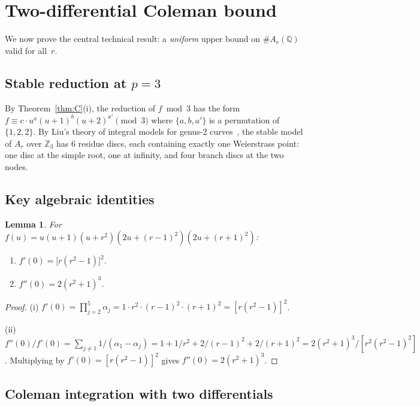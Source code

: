 \documentclass[11pt]{amsart}
\theoremstyle{plain}
\newtheorem{lemma}[theorem]{Lemma}
\theoremstyle{definition}
\theoremstyle{remark}
\newcommand{\ZZ}{\mathbb{Z}}
\newcommand{\QQ}{\mathbb{Q}}
\begin{document}
\section{Two-differential Coleman bound}\label{sec:coleman}

We now prove the central technical result: a \emph{uniform} upper bound on
$\#A_r(\QQ)$ valid for all~$r$.

\subsection{Stable reduction at $p=3$}

By Theorem~\ref{thm:C}(i), the reduction of $f\bmod 3$ has the form
$f\equiv c\cdot u^a(u{+}1)^b(u{+}2)^{a'}\pmod{3}$
where $\{a,b,a'\}$ is a permutation of $\{1,2,2\}$.
By Liu's theory of integral models for genus-2 curves~\cite{LiuGenusTwo},
the stable model of $A_r$ over $\ZZ_3$ has 6 residue discs, each containing
exactly one Weierstrass point: one disc at the simple root, one at infinity,
and four branch discs at the two nodes.

\subsection{Key algebraic identities}

\begin{lemma}\label{lem:derivatives}
For $f(u)=u(u{+}1)(u{+}r^2)(2u{+}(r{-}1)^2)(2u{+}(r{+}1)^2)$:
\begin{enumerate}[label=\textup{(\roman*)}]
\item $f'(0) = \bigl[r(r^2-1)\bigr]^2$.
\item $f''(0) = 2(r^2+1)^3$.
\end{enumerate}
\end{lemma}

\begin{proof}
(i) $f'(0)=\prod_{j=2}^{5}\alpha_j = 1\cdot r^2\cdot(r{-}1)^2\cdot(r{+}1)^2
= [r(r^2-1)]^2$.

(ii) $f''(0)/f'(0)=\sum_{j\ne 1}1/(\alpha_1-\alpha_j)
= 1+1/r^2+2/(r{-}1)^2+2/(r{+}1)^2 = 2(r^2+1)^3/[r^2(r^2-1)^2]$.
Multiplying by $f'(0)=[r(r^2-1)]^2$ gives $f''(0)=2(r^2+1)^3$.
\end{proof}

\subsection{Coleman integration with two differentials}
\end{document}
